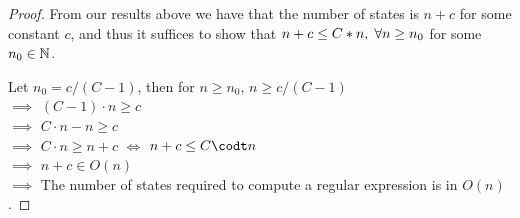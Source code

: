 \documentclass[11pt]{article}
\begin{document}
\begin{proof}
From our results above we have that the number of states is $n + c$ for some constant $c$, and thus it suffices to show that $n + c \leq C*n, \hspace{1mm} \forall n \geq n_{0}$ for some $n_{0} \in \mathbb{N}$.

Let $n_{0} = c/(C-1)$, then for $n \geq n_{0}$, $n \geq c/(C-1)$
\\$\implies$ $(C-1) \cdot n \geq c$
\\$\implies$ $C\cdot n - n \geq c$
\\$\implies$ $C \cdot n \geq n + c$ $\iff$ $n + c \leq C \codt n$
\\$\implies$ $n+c \in O(n)$
\\$\implies$ The number of states required to compute a regular expression is in $O(n)$.
\end{proof}
\end{document}
